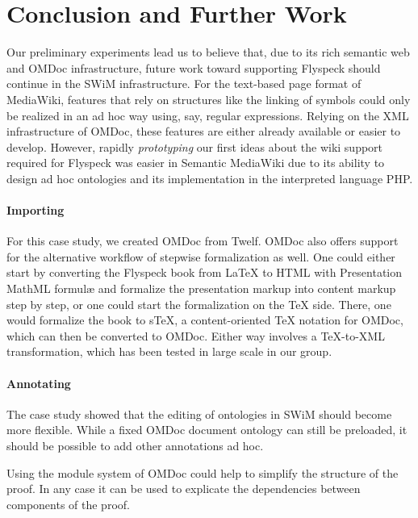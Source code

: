 
\section{Conclusion and Further Work}
\label{sec:conc}

Our preliminary experiments lead us to believe that, due to its rich
semantic web and OMDoc infrastructure, future work toward supporting
Flyspeck should continue in the SWiM infrastructure.  For the text-based
page format of MediaWiki, features that rely on structures like the
linking of symbols could only be realized in an ad hoc way
using, say, regular expressions.  Relying on the XML infrastructure of
OMDoc, these features are either already available or easier to develop.
However, rapidly \emph{prototyping} our first ideas about the wiki
support required for Flyspeck was easier in Semantic MediaWiki due to
its ability to design ad hoc ontologies and its implementation in the
interpreted language PHP.

\paragraph{Importing} For this case study, we created OMDoc from Twelf. OMDoc
also offers support for the alternative workflow of stepwise formalization as
well.  One could either start by converting the Flyspeck book from {\LaTeX} to
HTML with Presentation MathML formulæ and formalize the presentation markup into
content markup step by step, or one could start the formalization on the {\TeX}
side.  There, one would formalize the book to s\TeX{}, a content-oriented {\TeX}
notation for OMDoc, which can then be converted to OMDoc\cite{Kohlhase:albwo06}.
Either way involves a {\TeX}-to-XML transformation, which has been tested in
large scale in our group\cite{URL:arXMLiv}.

\paragraph{Annotating} The case study showed that the editing of ontologies in
SWiM should become more flexible.  While a fixed OMDoc document ontology can
still be preloaded, it should be possible to add other annotations ad hoc.

Using the module system of OMDoc could help to simplify
the structure of the proof. In any case it can be used to explicate
the dependencies between components of the proof. 


